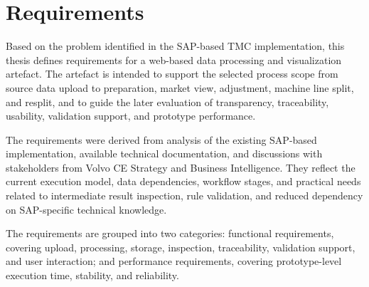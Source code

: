 \section{Requirements}
\label{sec:requirements}


Based on the problem identified in the SAP-based TMC implementation, this thesis defines requirements for a web-based data processing and visualization artefact. The artefact is intended to support the selected process scope from source data upload to preparation, market view, adjustment, machine line split, and resplit, and to guide the later evaluation of transparency, traceability, usability, validation support, and prototype performance.

The requirements were derived from analysis of the existing SAP-based implementation, available technical documentation, and discussions with stakeholders from Volvo CE Strategy and Business Intelligence. They reflect the current execution model, data dependencies, workflow stages, and practical needs related to intermediate result inspection, rule validation, and reduced dependency on SAP-specific technical knowledge.

The requirements are grouped into two categories: functional requirements, covering upload, processing, storage, inspection, traceability, validation support, and user interaction; and performance requirements, covering prototype-level execution time, stability, and reliability.

